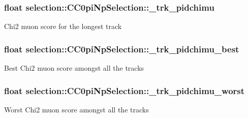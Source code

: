 \subsubsection[{\texorpdfstring{\+\_\+trk\+\_\+pidchimu}{_trk_pidchimu}}]{\setlength{\rightskip}{0pt plus 5cm}float selection\+::\+C\+C0pi\+Np\+Selection\+::\+\_\+trk\+\_\+pidchimu\hspace{0.3cm}{\ttfamily [private]}}\hypertarget{classselection_1_1CC0piNpSelection_a74ddf5622f3ee32110e9342361020a89}{}\label{classselection_1_1CC0piNpSelection_a74ddf5622f3ee32110e9342361020a89}
Chi2 muon score for the longest track 
\subsubsection[{\texorpdfstring{\+\_\+trk\+\_\+pidchimu\+\_\+best}{_trk_pidchimu_best}}]{\setlength{\rightskip}{0pt plus 5cm}float selection\+::\+C\+C0pi\+Np\+Selection\+::\+\_\+trk\+\_\+pidchimu\+\_\+best\hspace{0.3cm}{\ttfamily [private]}}\hypertarget{classselection_1_1CC0piNpSelection_a04216d0564f79f3c4a267130cd70e753}{}\label{classselection_1_1CC0piNpSelection_a04216d0564f79f3c4a267130cd70e753}
Best Chi2 muon score amongst all the tracks 
\subsubsection[{\texorpdfstring{\+\_\+trk\+\_\+pidchimu\+\_\+worst}{_trk_pidchimu_worst}}]{\setlength{\rightskip}{0pt plus 5cm}float selection\+::\+C\+C0pi\+Np\+Selection\+::\+\_\+trk\+\_\+pidchimu\+\_\+worst\hspace{0.3cm}{\ttfamily [private]}}\hypertarget{classselection_1_1CC0piNpSelection_a9e88e0ae759d19106d964c13926fba4b}{}\label{classselection_1_1CC0piNpSelection_a9e88e0ae759d19106d964c13926fba4b}
Worst Chi2 muon score amongst all the tracks 
